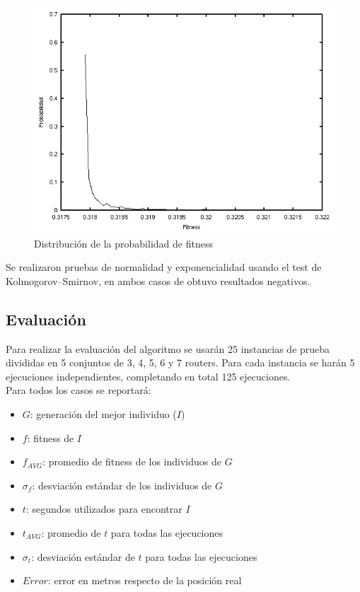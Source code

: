 \documentclass[journal]{IEEEtran}
\begin{document}
\begin{figure}[h]
\centering
\includegraphics[width=\linewidth]{density.png}
\caption{Distribución de la probabilidad de fitness}
\label{fig:density}
\end{figure}

Se realizaron pruebas de normalidad y exponencialidad usando el test de Kolmogorov–Smirnov, en ambos casos de obtuvo resultados negativos.

\subsection{Evaluación}

Para realizar la evaluación del algoritmo se usarán 25 instancias de prueba divididas en 5 conjuntos de 3, 4, 5, 6 y 7 routers. Para cada instancia se harán 5 ejecuciones independientes, completando en total 125 ejecuciones.\\

Para todos los casos se reportará:\\

\begin{itemize}
\item $G$: generación del mejor individuo ($I$)
\item $f$: fitness de $I$
\item $f_{AVG}$: promedio de fitness de los individuos de $G$
\item $\sigma_f$: desviación estándar de los individuos de $G$
\item $t$: segundos utilizados para encontrar $I$
\item $t_{AVG}$: promedio de $t$ para todas las ejecuciones
\item $\sigma_t$: desviación estándar de $t$ para todas las ejecuciones
\item $Error$: error en metros respecto de la posición real
\end{itemize}
\end{document}
